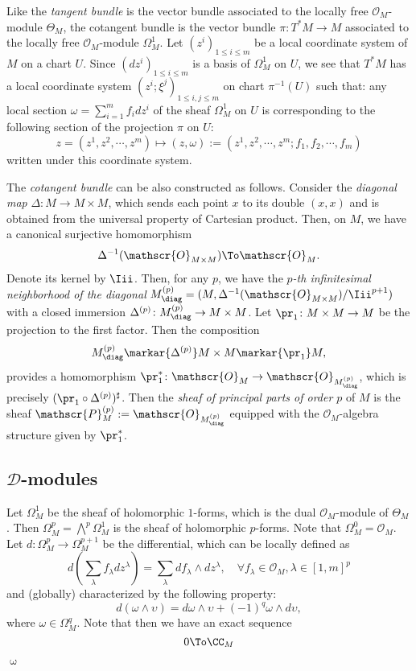 Like the \emph{tangent bundle} is the vector bundle associated to 
the locally free $\mathscr{O}_M$-module $\Theta_M$, the cotangent bundle 
is the vector bundle $\pi\colon T^{\ast}M\to M$ associated to 
the locally free $\mathscr{O}_M$-module $\Omega_{M}^1$. 
Let $(z^i)_{1\le i\le m}$ be a local coordinate system of $M$ on a chart $U$. 
Since $(dz^i)_{1\le i\le m}$ is a basis of $\Omega_{M}^1$ on $U$, 
we see that $T^{\ast}M$ has a local coordinate system 
$(z^i;\xi^j)_{1\le i,j\le m}$ on chart $\pi^{-1}(U)$ such that: 
any local section $\omega=\sum_{i=1}^{m}f_idz^i$ of the sheaf $\Omega_{M}^1$ on $U$ is corresponding to the following section of the projection $\pi$ on $U$:
\[
z=(z^1,z^2,\cdots,z^m)\longmapsto
(z,\omega):=(z^1,z^2,\cdots,z^m;f_1,f_2,\cdots,f_m)
\]
written under this coordinate system.
 
\begin{Rem}
\small
The \emph{cotangent bundle} can be also constructed as follows. 
Consider the \emph{diagonal map} $\Delta\colon M\to M\times M$, 
which sends each point $x$ to its double $(x,x)$ and 
is obtained from the universal property of Cartesian product. 
Then, on $M$, we have a canonical surjective homomorphism
\[
\Delta^{-1}(\mathscr{O}_{M\times M})\To\mathscr{O}_M.
\]
Denote its kernel by $\Iii$. 
Then, for any $p$, we have the 
\emph{$p$-th infinitesimal neighborhood of the diagonal} 
$M_{\diag}^{(p)}=(M,\Delta^{-1}(\mathscr{O}_{M\times M})/\Iii^{p+1})$ 
with a closed immersion $\Delta^{(p)}\colon M_{\diag}^{(p)}\to M\times M$. 
Let $\pr_1\colon M\times M\to M$ be the projection to the first factor.
Then the composition
\[
M_{\diag}^{(p)}\markar{\Delta^{(p)}}M\times M\markar{\pr_1}M,
\]
provides a homomorphism 
$\pr_1^\ast\colon\mathscr{O}_M\to\mathscr{O}_{M_{\diag}^{(p)}}$, 
which is precisely $(\pr_1\circ\Delta^{(p)})^{\sharp}$.
Then the \emph{sheaf of principal parts of order $p$} of $M$ 
is the sheaf $\mathscr{P}_M^{(p)}:=\mathscr{O}_{M_{\diag}^{(p)}}$ 
equipped with the $\mathscr{O}_M$-algebra structure given by $\pr_1^\ast$.
\end{Rem}

\subsection{$\mathscr{D}$-modules}

Let $\Omega_M^1$ be the sheaf of holomorphic $1$-forms, 
which is the dual $\mathscr{O}_M$-module of $\Theta_M$. 
Then $\Omega_M^p=\bigwedge^p\Omega_M^1$ is the sheaf of holomorphic $p$-forms. 
Note that $\Omega_M^0=\mathscr{O}_M$.
Let $d\colon\Omega_M^p\to\Omega_M^{p+1}$ be the differential, 
which can be locally defined as
\[
d(\sum_\lambda f_\lambda dz^\lambda)=\sum_\lambda df_\lambda\wedge dz^\lambda,
\quad \forall f_\lambda\in\mathscr{O}_M, \lambda\in[1,m]^p
\]
and (globally) characterized by the following property:
\[
d(\omega\wedge\upsilon)=d\omega\wedge\upsilon+(-1)^q\omega\wedge d\upsilon,
\]
where $\omega\in\Omega_M^q$. 
Note that then we have an exact sequence
\[
0\To\CC_M
\]

$\upomega$


\begin{bibdiv}
\begin{biblist}
\end{biblist}
\end{bibdiv}
